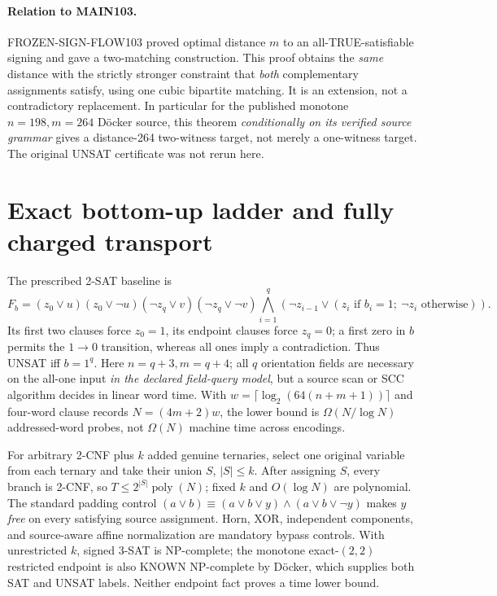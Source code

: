 \documentclass[11pt]{article}
\begin{document}
\paragraph{Relation to MAIN103.}
FROZEN-SIGN-FLOW103 proved optimal distance \(m\) to an all-TRUE-satisfiable signing and gave a two-matching construction. This proof obtains the \emph{same} distance with the strictly stronger constraint that \emph{both} complementary assignments satisfy, using one cubic bipartite matching. It is an extension, not a contradictory replacement. In particular for the published monotone \(n=198,m=264\) D\"ocker source, this theorem \emph{conditionally on its verified source grammar} gives a distance-264 two-witness target, not merely a one-witness target. The original UNSAT certificate was not rerun here.

\section{Exact bottom-up ladder and fully charged transport}
The prescribed 2-SAT baseline is
\[
F_b=(z_0\vee u)(z_0\vee\neg u)(\neg z_q\vee v)(\neg z_q\vee\neg v)
\bigwedge_{i=1}^q(\neg z_{i-1}\vee (z_i \text{ if }b_i=1;\ \neg z_i\text{ otherwise})).
\]
Its first two clauses force \(z_0=1\), its endpoint clauses force \(z_q=0\); a first zero in \(b\) permits the \(1\to0\) transition, whereas all ones imply a contradiction. Thus UNSAT iff \(b=1^q\). Here \(n=q+3,m=q+4\); all \(q\) orientation fields are necessary on the all-one input \emph{in the declared field-query model}, but a source scan or SCC algorithm decides in linear word time. With \(w=\lceil\log_2(64(n+m+1))\rceil\) and four-word clause records \(N=(4m+2)w\), the lower bound is \(\Omega(N/\log N)\) addressed-word probes, not \(\Omega(N)\) machine time across encodings.

For arbitrary 2-CNF plus \(k\) added genuine ternaries, select one original variable from each ternary and take their union \(S\), \(|S|\le k\). After assigning \(S\), every branch is 2-CNF, so \(T\le 2^{|S|}\operatorname{poly}(N)\); fixed \(k\) and \(O(\log N)\) are polynomial. The standard padding control
\((a\vee b)\equiv(a\vee b\vee y)\wedge(a\vee b\vee\neg y)\)
makes \(y\) \emph{free} on every satisfying source assignment. Horn, XOR, independent components, and source-aware affine normalization are mandatory bypass controls. With unrestricted \(k\), signed 3-SAT is NP-complete; the monotone exact-$(2,2)$ restricted endpoint is also KNOWN NP-complete by D\"ocker, which supplies both SAT and UNSAT labels. Neither endpoint fact proves a time lower bound.
\end{document}
